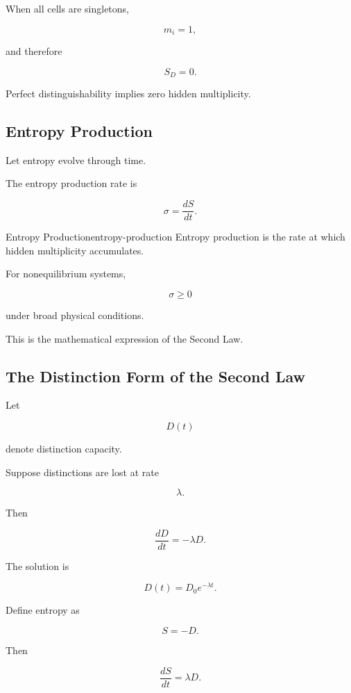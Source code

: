 \documentclass[12pt,twoside,openright]{book}
\begin{document}
When all cells are singletons,

\[
m_i=1,
\]

and therefore

\[
S_D=0.
\]

Perfect distinguishability implies zero hidden
multiplicity.

\subsection{Entropy Production}

Let entropy evolve through time.

The entropy production rate is

\[
\sigma
=

\frac{dS}{dt}.
\]

\begin{definition}{Entropy Production}{entropy-production}
Entropy production is the rate at which hidden
multiplicity accumulates.
\end{definition}

For nonequilibrium systems,

\[
\sigma \ge 0
\]

under broad physical conditions.

This is the mathematical expression of the Second Law.

\subsection{The Distinction Form of the Second Law}

Let

\[
D(t)
\]

denote distinction capacity.

Suppose distinctions are lost at rate

\[
\lambda.
\]

Then

\[
\frac{dD}{dt}
=

-\lambda D.
\]

The solution is

\[
D(t)
=

D_0 e^{-\lambda t}.
\]

Define entropy as

\[
S
=

-D.
\]

Then

\[
\frac{dS}{dt}
=

\lambda D.
\]
\end{document}
